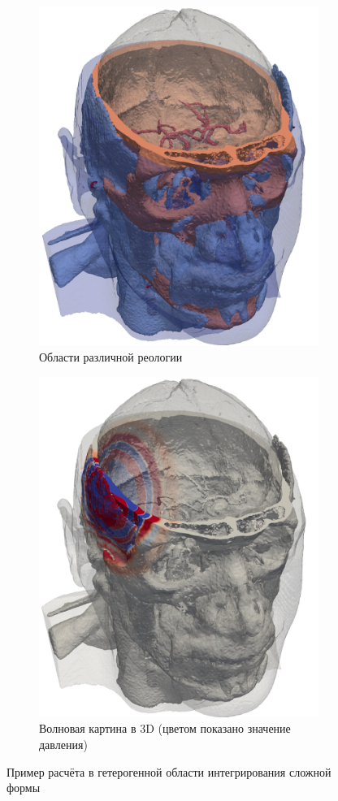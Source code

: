 \documentclass[a4paper]{article}
\numberwithin{equation}{section}
\begin{document}
\begin{figure}[H]
\centering
\begin{subfigure}{.4\textwidth}
  \centering
  \includegraphics[width=0.7\linewidth]{pictures/skull/materials-all.png}
  \caption{Области различной реологии}
  \label{fig:materials-3d}
\end{subfigure}%
\begin{subfigure}{.4\textwidth}
  \centering
  \includegraphics[width=0.7\linewidth]{pictures/skull/waves-3d.png}
  \caption{Волновая картина в 3D (цветом показано значение давления)}
  \label{fig:waves-3d}
\end{subfigure}
\caption{Пример расчёта в гетерогенной области интегрирования сложной формы}
\label{fig:results-3d}
\end{figure}
\end{document}

